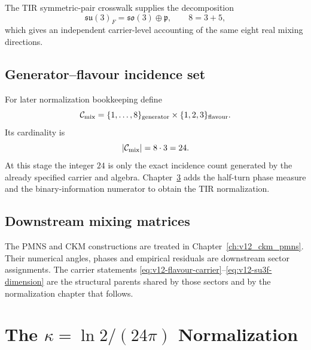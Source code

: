 The TIR symmetric-pair crosswalk supplies the decomposition
\begin{equation}
\mathfrak{su}(3)_F
=\mathfrak{so}(3)\oplus\mathfrak p,
\qquad
8=3+5,
\label{eq:v12-su3-symmetric-pair}
\end{equation}
which gives an independent carrier-level accounting of the same eight real
mixing directions.

\section{Generator--flavour incidence set}
For later normalization bookkeeping define
\begin{equation}
\mathcal C_{\rm mix}
=\{1,\ldots,8\}_{\rm generator}
\times\{1,2,3\}_{\rm flavour}.
\label{eq:v12-mixing-incidence-set}
\end{equation}
Its cardinality is
\begin{equation}
|\mathcal C_{\rm mix}|
=8\cdot3
=24.
\label{eq:v12-mixing-incidence-cardinality}
\end{equation}
At this stage the integer $24$ is only the exact incidence count generated by
the already specified carrier and algebra.  Chapter~\ref{ch:v12_kappa_normalization}
adds the half-turn phase measure and the binary-information numerator to obtain
the TIR normalization.

\section{Downstream mixing matrices}
The PMNS and CKM constructions are treated in
Chapter~\ref{ch:v12_ckm_pmns}.  Their numerical angles, phases and empirical
residuals are downstream sector assignments.  The carrier statements
\eqref{eq:v12-flavour-carrier}--\eqref{eq:v12-su3f-dimension} are the structural
parents shared by those sectors and by the normalization chapter that follows.

\clearpage

\chapter[The Kappa Normalization]{The \texorpdfstring{$\kappa=\ln2/(24\pi)$}{kappa = ln2/(24 pi)} Normalization}
\label{ch:v12_kappa_normalization}

